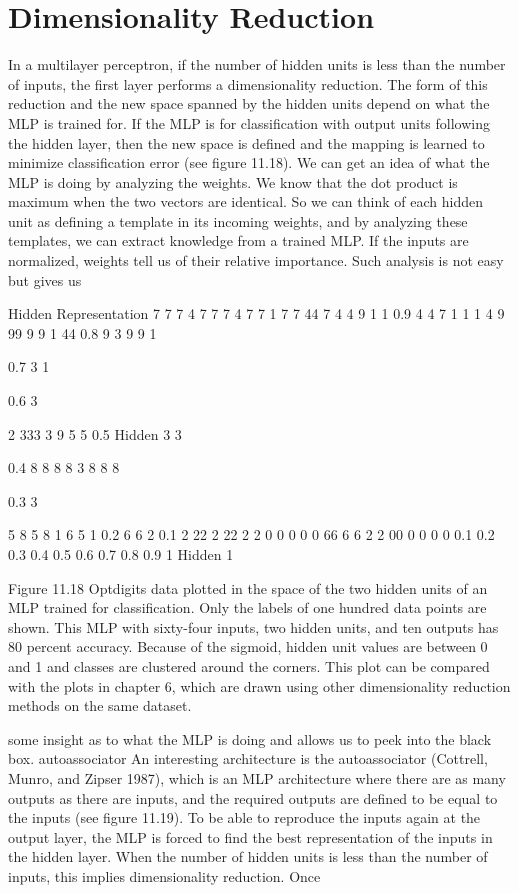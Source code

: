 \section{Dimensionality Reduction}

In a multilayer perceptron, if the number of hidden units is less than the number of inputs, the first layer performs a dimensionality reduction. The form of this reduction and the new space spanned by the hidden units depend on what the MLP is trained for. If the MLP is for classification with output units following the hidden layer, then the new space is defined and the mapping is learned to minimize classification error (see figure 11.18). We can get an idea of what the MLP is doing by analyzing the weights. We know that the dot product is maximum when the two vectors are identical. So we can think of each hidden unit as defining a template in its incoming weights, and by analyzing these templates, we can extract knowledge from a trained MLP. If the inputs are normalized, weights tell us of their relative importance. Such analysis is not easy but gives us

Hidden Representation 7 7 7 4 7 7 7 4 7 7 1 7 7 44 7 4 4 9 1 1 0.9 4 4 7 1 1 1 4 9 99 9 9 1 44 0.8 9 3 9 9 1

0.7 3 1

0.6 3

2 333 3 9 5 5 0.5 Hidden 3 3

0.4 8 8 8 8 3 8 8 8

0.3 3

5 8 5 8 1 6 5 1 0.2 6 6 2 0.1 2 22 2 22 2 2 0 0 0 0 0 66 6 6 2 2 00 0 0 0 0 0.1 0.2 0.3 0.4 0.5 0.6 0.7 0.8 0.9 1 Hidden 1

Figure 11.18 Optdigits data plotted in the space of the two hidden units of an MLP trained for classification. Only the labels of one hundred data points are shown. This MLP with sixty-four inputs, two hidden units, and ten outputs has 80 percent accuracy. Because of the sigmoid, hidden unit values are between 0 and 1 and classes are clustered around the corners. This plot can be compared with the plots in chapter 6, which are drawn using other dimensionality reduction methods on the same dataset.

some insight as to what the MLP is doing and allows us to peek into the black box. autoassociator An interesting architecture is the autoassociator (Cottrell, Munro, and Zipser 1987), which is an MLP architecture where there are as many outputs as there are inputs, and the required outputs are defined to be equal to the inputs (see figure 11.19). To be able to reproduce the inputs again at the output layer, the MLP is forced to find the best representation of the inputs in the hidden layer. When the number of hidden units is less than the number of inputs, this implies dimensionality reduction. Once

